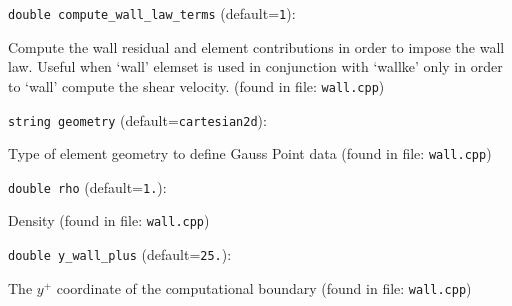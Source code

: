 \item\verb+double compute_wall_law_terms+ {\rm(default=\verb|1|)}:

Compute the wall residual and element contributions
in order to impose the wall law. Useful when `wall'
elemset is used in conjunction with `wallke' only in order to
`wall' compute the shear velocity. 
 (found in file: \verb+wall.cpp+)
\item\verb+string geometry+ {\rm(default=\verb|cartesian2d|)}:

Type of element geometry to define Gauss Point data
 (found in file: \verb+wall.cpp+)
\item\verb+double rho+ {\rm(default=\verb|1.|)}:

Density
 (found in file: \verb+wall.cpp+)
\item\verb+double y_wall_plus+ {\rm(default=\verb|25.|)}:

The $y^+$ coordinate of the computational boundary
 (found in file: \verb+wall.cpp+)
